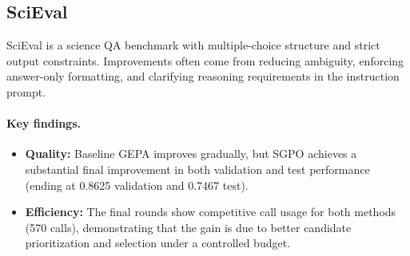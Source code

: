 \begin{table}[H]
\centering
\small
\caption{Comparison between Original GEPA and SGPO (\textit{MATH-500}).}
\label{tab:math500}
\end{table}

\subsection{SciEval}
SciEval is a science QA benchmark with multiple-choice structure and strict output constraints. Improvements often come from reducing ambiguity, enforcing answer-only formatting, and clarifying reasoning requirements in the instruction prompt.

\paragraph{Key findings.}
\begin{itemize}
    \item \textbf{Quality:} Baseline GEPA improves gradually, but SGPO achieves a substantial final improvement in both validation and test performance (ending at 0.8625 validation and 0.7467 test).
    \item \textbf{Efficiency:} The final rounds show competitive call usage for both methods (570 calls), demonstrating that the gain is due to better candidate prioritization and selection under a controlled budget.
\end{itemize}


